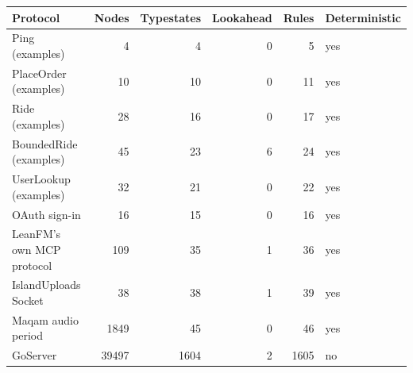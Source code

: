 \begin{tabular}{@{}lrrrrl@{}}
\toprule
Protocol & Nodes & Typestates & Lookahead & Rules & Deterministic \\
\midrule
Ping (examples) & 4 & 4 & 0 & 5 & yes \\
PlaceOrder (examples) & 10 & 10 & 0 & 11 & yes \\
Ride (examples) & 28 & 16 & 0 & 17 & yes \\
BoundedRide (examples) & 45 & 23 & 6 & 24 & yes \\
UserLookup (examples) & 32 & 21 & 0 & 22 & yes \\
OAuth sign-in & 16 & 15 & 0 & 16 & yes \\
LeanFM's own MCP protocol & 109 & 35 & 1 & 36 & yes \\
IslandUploads Socket & 38 & 38 & 1 & 39 & yes \\
Maqam audio period & 1849 & 45 & 0 & 46 & yes \\
GoServer & 39497 & 1604 & 2 & 1605 & no \\
\bottomrule
\end{tabular}
